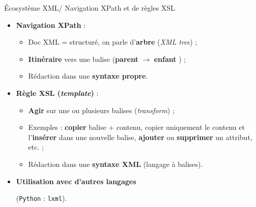 \documentclass{beamer}
\begin{document}
  \begin{frame}{Écosystème XML/ Navigation XPath et de règles XSL}
  \Large
  \begin{itemize}
      \item \textbf{Navigation XPath} :
      \begin{itemize}
          \item Doc XML = structuré, on parle d'\og \textbf{arbre} \fg{} (\textit{XML tree}) ; 
          \item \textbf{Itinéraire} vers une balise (\og \textbf{parent} \fg{} $\rightarrow$ \og \textbf{enfant} \fg{}) ; %
          \item Rédaction dans une \textbf{syntaxe propre}. %
      \end{itemize}
      \bigskip
      \item \textbf{Règle XSL (\textit{template})} :
      \begin{itemize}
          \item \textbf{Agir} sur une ou plusieurs balises (\textit{transform}) ;
          \item Exemples : \textbf{copier} balise + contenu, copier uniquement le contenu et l'\textbf{insérer} dans une nouvelle balise, \textbf{ajouter} ou \textbf{supprimer} un attribut, etc. ;
          \item Rédaction dans une \textbf{syntaxe XML} (langage à balises).
      \end{itemize}
      \bigskip
      \item \textbf{Utilisation avec d'autres langages}
      
      \normalsize (\texttt{Python} :  \texttt{lxml}).
  \end{itemize}
   
  \end{frame}
  
\end{document}
